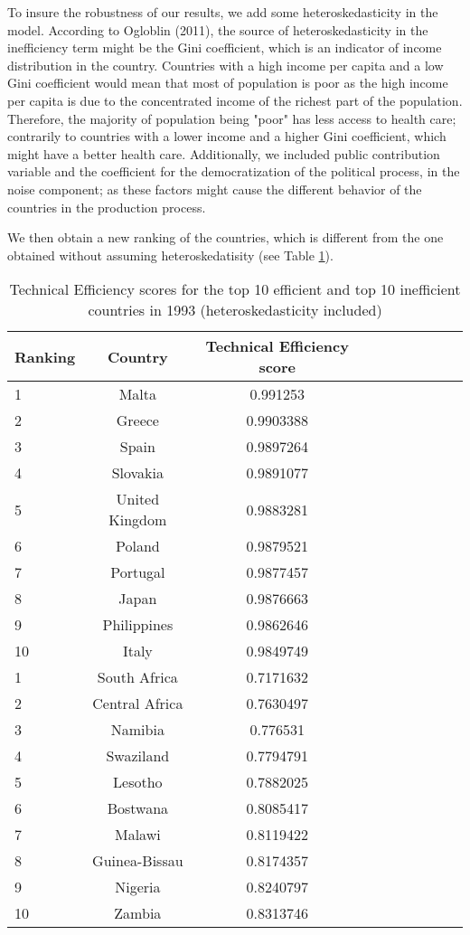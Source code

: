 \documentclass[12pt,a4paper]{article}\usepackage[]{graphicx}\usepackage[]{color}
\begin{document}
To insure the robustness of our results, we add some heteroskedasticity in the model. According to Ogloblin (2011),  the source of heteroskedasticity in the inefficiency term might be the Gini coefficient, which is an indicator of income distribution in the country. Countries with a high income per capita and a low Gini coefficient would mean that most of population is poor as the high income per capita is due to the concentrated income of the richest part of the population. Therefore, the majority of population being "poor" has less access to health care; contrarily to countries with a lower income and a higher Gini coefficient, which might have a better health care. Additionally, we included public contribution variable and the coefficient for  the democratization of the political process, in the noise component; as these factors might cause the different behavior of the countries in the production process.

We then obtain a new ranking of the countries, which is different from the one obtained without assuming heteroskedatisity (see Table \ref{2}).
 
     \begin{table}[H]
\centering

\caption{Technical Efficiency scores for the top 10 efficient and top 10 inefficient countries in 1993 (heteroskedasticity included)} 
\begin{tabular}{lccccccccc}
 \label{2}
 
 Ranking & Country & Technical Efficiency score\\ 

  \hline \hline
   1 & Malta& 0.991253\\ 
   2 & Greece & 0.9903388   \\ 
   3 & Spain &  0.9897264 \\ 
  4 & Slovakia&   0.9891077    \\ 
 5 & United Kingdom &  0.9883281 \\ 
 6 & Poland & 0.9879521\\
 7 & Portugal & 0.9877457 \\
 8 & Japan  & 0.9876663 \\
 9 & Philippines & 0.9862646 \\
 10 & Italy & 0.9849749 \\
   \hline 
   1 & South Africa& 0.7171632 \\ 
   2 & Central Africa & 0.7630497\\ 
   3 & Namibia &  0.776531\\ 
  4 & Swaziland&   0.7794791  \\ 
 5 & Lesotho &  0.7882025 \\ 
 6 & Bostwana & 0.8085417 \\
 7 & Malawi & 0.8119422\\
 8 & Guinea-Bissau  & 0.8174357 \\
 9 & Nigeria & 0.8240797 \\
 10 & Zambia & 0.8313746 \\
   \hline \hline
\end{tabular}

\end{table}
\end{document}
